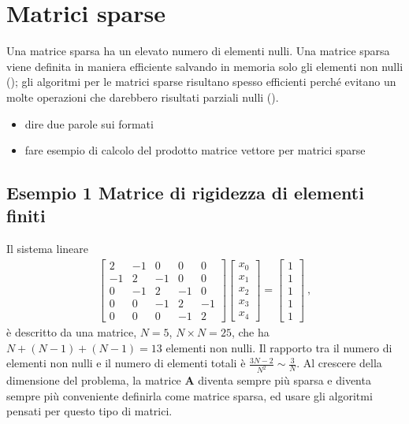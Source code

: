 \documentclass[letterpaper,10pt,italian]{jupyterBook}
\begin{document}
\section{Matrici sparse}
\label{\detokenize{ch/numerics/linear:matrici-sparse}}
\sphinxAtStartPar
Una matrice sparsa ha un elevato numero di elementi nulli. Una matrice sparsa viene definita in maniera efficiente salvando in memoria solo gli elementi non nulli (); gli algoritmi per le matrici sparse risultano spesso efficienti perché evitano un molte operazioni che darebbero risultati parziali nulli ().
\begin{itemize}
\item {} 
\sphinxAtStartPar
{} dire due parole sui formati

\item {} 
\sphinxAtStartPar
{} fare esempio di calcolo del prodotto matrice vettore per matrici sparse

\end{itemize}


\subsection{Esempio 1 \sphinxhyphen{} Matrice di rigidezza di elementi finiti}
\label{\detokenize{ch/numerics/linear:esempio-1-matrice-di-rigidezza-di-elementi-finiti}}
\sphinxAtStartPar
Il sistema lineare
\begin{equation*}
\begin{split}\begin{bmatrix} 2 & -1 & 0 & 0 & 0 \\ -1 & 2 & -1 & 0 & 0 \\ 0 & -1 & 2 & -1 & 0 \\ 0 & 0 & -1 & 2 & -1 \\ 0 & 0 & 0 & -1  & 2 \end{bmatrix} \begin{bmatrix} x_0 \\ x_1 \\ x_2 \\ x_3 \\ x_4 \end{bmatrix} = \begin{bmatrix} 1 \\ 1 \\ 1 \\ 1 \\ 1 \end{bmatrix} \ ,\end{split}
\end{equation*}
\sphinxAtStartPar
è descritto da una matrice, \(N=5\), \(N \times N = 25\), che ha \(N+(N-1)+(N-1) = 13\) elementi non nulli. Il rapporto tra il numero di elementi non nulli e il numero di elementi totali è \(\frac{3N-2}{N^2} \sim \frac{3}{N}\). Al crescere della dimensione del problema, la matrice \(\mathbf{A}\) diventa sempre più sparsa e diventa sempre più conveniente definirla come matrice sparsa, ed usare gli algoritmi pensati per questo tipo di matrici.
\end{document}
